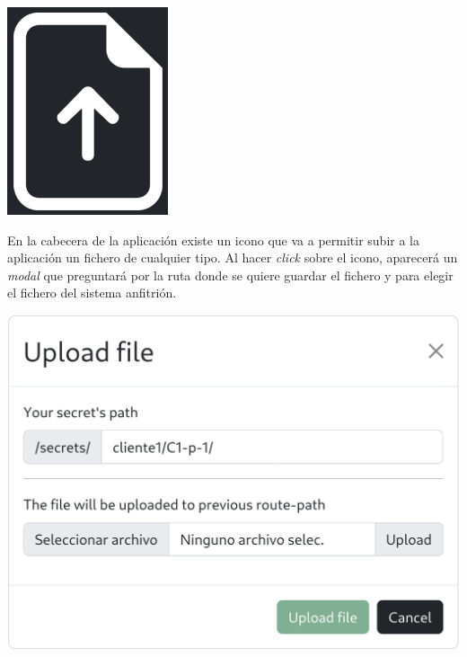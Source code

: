 \documentclass{\ClassPath/viu-tfm-template}
\begin{document}
{
    \begin{minipage}{0.1\linewidth}
        \includegraphics[width=\linewidth]{img/upload.png}
    \end{minipage}
    \hspace{0.5cm}
    \begin{minipage}{0.9\linewidth}
        En la cabecera de la aplicación existe un icono que va a permitir subir a la aplicación un fichero de cualquier tipo. Al hacer \textit{click} sobre el icono, aparecerá un \textit{modal} que preguntará por la ruta donde se quiere guardar el fichero y para elegir el fichero del sistema anfitrión.
    \end{minipage}
}

\begin{center}
    \includegraphics[width=0.7\linewidth]{img/upload_modal.png}
\end{center}
\end{document}
